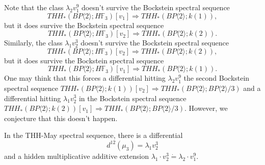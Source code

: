 Note that the class $\lambda_2v_1^9$ doesn't survive the Bockstein spectral sequence 
\[THH_*(BP\langle 2\rangle ; H\mathbb{F}_3)[v_1]\Rightarrow THH_*(BP\langle 2\rangle ; k(1)),\] 
but it does survive the Bockstein spectral sequence 
\[THH_*(BP\langle 2\rangle ; H\mathbb{F}_3)[v_2]\Rightarrow THH_*(BP\langle 2\rangle ; k(2)).\] 
Similarly, the class $\lambda_1 v_2^3$ doesn't survive the Bockstein spectral sequence 
\[THH_*(BP\langle 2\rangle ; H\mathbb{F}_3)[v_2]\Rightarrow THH_*(BP\langle 2\rangle ; k(2)),\] 
but it does survive the Bockstein spectral sequence 
\[THH_*(BP\langle 2\rangle ; H\mathbb{F}_3)[v_1]\Rightarrow THH_*(BP\langle 2\rangle ; k(1)).\] 
One may think that this forces a differential hitting $\lambda_2v_1^9$ the second Bockstein spectral sequence $THH_*(BP\langle 2\rangle ; k(1))[v_2]\Rightarrow THH_*(BP\langle 2\rangle ; BP\langle 2\rangle /3 )$ and a differential hitting $\lambda_1 v_2^3$ in the Bockstein spectral sequence $THH_*(BP\langle 2\rangle ; k(2))[v_1]\Rightarrow THH_*(BP\langle 2\rangle ;BP\langle 2\rangle/3 )$. However, we conjecture that this doesn't happen.
\begin{conjecture}
In the THH-May spectral sequence, there is a differential 
\[d^{12}(\mu_3)=\lambda_1v_2^3\] 
and a hidden multiplicative additive extension $\lambda_1 \cdot v_2^3\dot{=}\lambda_2 \cdot v_1^9$. 
\end{conjecture}

